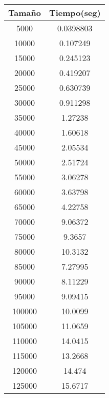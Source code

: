 \begin{longtable}{|c|c|}
\hline
\textbf{Tamaño} & \textbf{Tiempo(seg)} \\ \hline
5000   & 0.0398803   \\ \hline
10000  & 0.107249    \\ \hline
15000  & 0.245123    \\ \hline
20000  & 0.419207    \\ \hline
25000  & 0.630739    \\ \hline
30000  & 0.911298    \\ \hline
35000  & 1.27238     \\ \hline
40000  & 1.60618     \\ \hline
45000  & 2.05534     \\ \hline
50000  & 2.51724     \\ \hline
55000  & 3.06278     \\ \hline
60000  & 3.63798     \\ \hline
65000  & 4.22758     \\ \hline
70000  & 9.06372     \\ \hline
75000  & 9.3657      \\ \hline
80000  & 10.3132     \\ \hline
85000  & 7.27995     \\ \hline
90000  & 8.11229     \\ \hline
95000  & 9.09415     \\ \hline
100000 & 10.0099     \\ \hline
105000 & 11.0659     \\ \hline
110000 & 14.0415     \\ \hline
115000 & 13.2668     \\ \hline
120000 & 14.474      \\ \hline
125000 & 15.6717     \\ \hline
\end{longtable}
